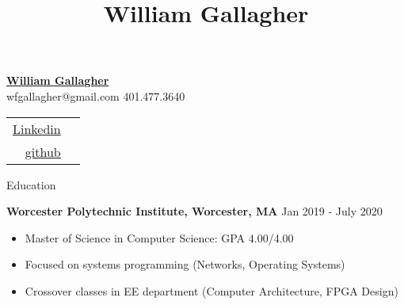 \documentclass[10pt,a4paper]{article}
\title{William Gallagher}
\begin{document}
{\selectfont

\begin{tcolorbox}
  \begin{minipage}{.5\textwidth}
    \underline{\huge{\textbf{William Gallagher}}}\\
    \normalsize{wfgallagher@gmail.com}
    \textbar
    \normalsize{ 401.477.3640}
  \end{minipage}
  \begin{minipage}{.5\textwidth}
      \begin{center}
        \begin{flushright}
          {\textcolor{black}
            {
              {\selectfont
                \begin{tabular} {r l}
                  \href{https://www.linkedin.com/in/william-gallagher-705199170}{Linkedin} \\
                  \href{https://github.com/william-gallagher/}{github} \\
                \end{tabular}
              }
            }
          }
        \end{flushright}
      \end{center}
  \end{minipage}
\end{tcolorbox}

\begin{tcolorbox}

  {\selectfont
    \begin{center}
      \LARGE{Education}
    \end{center}
  }

  \tcblower

      \large{\textbf{Worcester Polytechnic Institute, Worcester, MA }}
      \hfill
      \large{Jan 2019 - July 2020}
      \begin{itemize}[noitemsep]
        \item Master of Science in Computer Science: GPA 4.00/4.00
        \item Focused on systems programming (Networks, Operating Systems) 
        \item Crossover classes in EE department (Computer Architecture, FPGA Design)

      \end{itemize}


\end{tcolorbox}}
\end{document}
